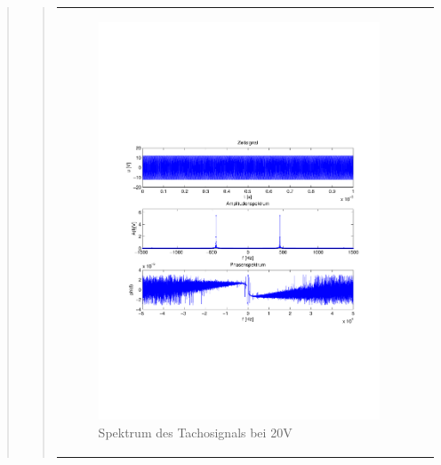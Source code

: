 \begin{quote}
\begin{quote}
\begin{center}
\begin{tabular}{ll}
\begin{minipage}{0.6\textwidth}
                    \end{minipage}
                    \begin{minipage}{0.6\textwidth}
    
                        \begin{figure}[H]
                            \label{fig:}
                            \includegraphics[scale=0.45, trim = 0.8cm 7cm 3cm
                            8.5cm,
                            clip]{./Bilder/ampl_spektrum_messung2_tacho}
                            \caption{Spektrum des Tachosignals bei 20V}
                        \end{figure}
                    \vspace{-1.5em}
    
                    \end{minipage}
    

\end{tabular}
\end{center}
\end{quote}
\end{quote}

